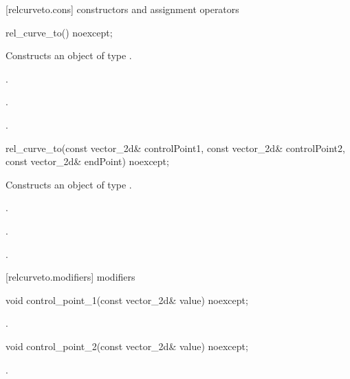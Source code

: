  [relcurveto.cons] { constructors and assignment operators}

\begin{itemdecl}
    rel_curve_to() noexcept;
\end{itemdecl}
\begin{itemdescr}
	\pnum
	\effects
	Constructs an object of type .
	
	\pnum
	\postconditions
	.

	.

	.

\end{itemdescr}

\begin{itemdecl}
    rel_curve_to(const vector_2d& controlPoint1, const vector_2d& controlPoint2,
      const vector_2d& endPoint) noexcept;
\end{itemdecl}
\begin{itemdescr}
	\pnum
	\effects
	Constructs an object of type .
	
	\pnum
	\postconditions
	.

	.

	.

\end{itemdescr}

 [relcurveto.modifiers]{ modifiers}

\begin{itemdecl}
    void control_point_1(const vector_2d& value) noexcept;
\end{itemdecl}
\begin{itemdescr}
	\pnum
	\postconditions
	.
	
\end{itemdescr}

\begin{itemdecl}
    void control_point_2(const vector_2d& value) noexcept;
\end{itemdecl}
\begin{itemdescr}
	\pnum
	\postconditions
	.
	
\end{itemdescr}

